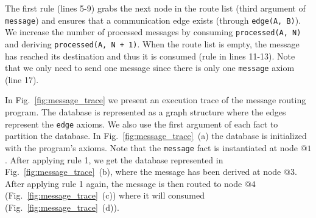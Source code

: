 The first rule (lines 5-9) grabs the next node in the route list (third argument of \texttt{message}) and
ensures that a communication edge exists (through \texttt{edge(A, B)}). We increase the number of
processed messages by consuming \texttt{processed(A, N)} and deriving \texttt{processed(A, N + 1)}.
When the route list is empty, the message has reached its destination and thus it is consumed
(rule in lines 11-13).
Note that we only need to send one message since there is only one \texttt{message} axiom (line 17).

In Fig.~\ref{fig:message_trace} we present an execution trace of the message routing program.
The database is represented as a graph structure where the edges represent the \texttt{edge}
axioms. We also use the first argument of each fact to partition the database.
In Fig.~\ref{fig:message_trace}~(a) the database is initialized with the program's axioms. Note that
the \texttt{message} fact is instantiated at node $@1$. After applying rule 1, we get the database represented
in Fig.~\ref{fig:message_trace}~(b), where the message has been derived at node $@3$. After applying rule 1 again,
the message is then routed to node $@4$ (Fig.~\ref{fig:message_trace}~(c)) where it will consumed (Fig.~\ref{fig:message_trace}~(d)).

